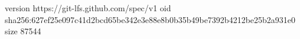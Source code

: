 version https://git-lfs.github.com/spec/v1
oid sha256:627ef25e097c41d2bcd65be342e3e88e8b0b35b49be7392b4212be25b2a931e0
size 87544

